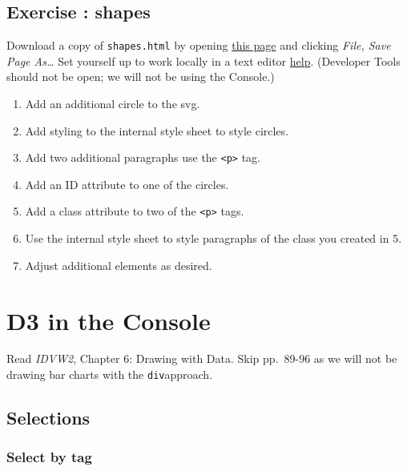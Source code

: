 \documentclass[
  openany]{book}
\begin{document}
\hypertarget{exercise-shapes}{%
\section{Exercise : shapes}\label{exercise-shapes}}

Download a copy of \texttt{shapes.html} by opening \href{https://raw.githubusercontent.com/jtr13/d3book/master/code/shapes.html}{this page} and clicking \emph{File, Save Page As\ldots{}} Set yourself up to work locally in a text editor \href{index.html\#text-editor}{help}. (Developer Tools should not be open; we will not be using the Console.)

\begin{enumerate}
\def\labelenumi{\arabic{enumi}.}
\item
  Add an additional circle to the svg.
\item
  Add styling to the internal style sheet to style circles.
\item
  Add two additional paragraphs use the \texttt{\textless{}p\textgreater{}} tag.
\item
  Add an ID attribute to one of the circles.
\item
  Add a class attribute to two of the \texttt{\textless{}p\textgreater{}} tags.
\item
  Use the internal style sheet to style paragraphs of the class you created in 5.
\item
  Adjust additional elements as desired.
\end{enumerate}

\protect\hyperlink{web-tech-shapes}{}

\hypertarget{d3console}{%
\chapter{\texorpdfstring{D3 in the Console }{D3 in the Console }}\label{d3console}}

Read \emph{IDVW2}, Chapter 6: Drawing with Data. Skip pp.~89-96 as we will not be drawing bar charts with the \texttt{div}approach.

\hypertarget{selections}{%
\section{\texorpdfstring{Selections }{Selections }}\label{selections}}

\hypertarget{select-by-tag}{%
\subsection{Select by tag}\label{select-by-tag}}
\end{document}
